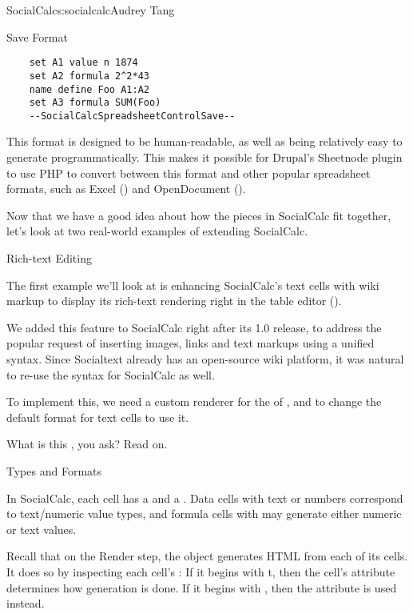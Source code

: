 \begin{aosachapter}{SocialCalc}{s:socialcalc}{Audrey Tang}
\begin{aosasect1}{Save Format}
\begin{verbatim}
    set A1 value n 1874
    set A2 formula 2^2*43
    name define Foo A1:A2
    set A3 formula SUM(Foo)
    --SocialCalcSpreadsheetControlSave--
\end{verbatim}

\noindent This format is designed to be human-readable, as well as being
relatively easy to generate programmatically.  This makes it possible
for Drupal's Sheetnode plugin to use PHP to convert
between this format and other popular spreadsheet formats, such as
Excel () and OpenDocument ().

Now that we have a good idea about how the pieces in SocialCalc fit
together, let's look at two real-world examples of extending
SocialCalc.

\end{aosasect1}

\begin{aosasect1}{Rich-text Editing}

The first example we'll look at is enhancing SocialCalc's text cells
with wiki markup to display its rich-text rendering right in the
table editor ().


We added this feature to SocialCalc right after its 1.0 release, to
address the popular request of inserting images, links and text
markups using a unified syntax.  Since Socialtext already has an
open-source wiki platform, it was natural to re-use the syntax for
SocialCalc as well.

To implement this, we need a custom renderer for the
 of , and to change the default
format for text cells to use it.

What is this , you ask?  Read on.

\begin{aosasect2}{Types and Formats}

In SocialCalc, each cell has a  and a .
Data cells with text or numbers correspond to text/numeric value
types, and formula cells with  may generate either
numeric or text values.

Recall that on the Render step, the  object generates HTML
from each of its cells.  It does so by inspecting each cell's
: If it begins with t, then the cell's
 attribute determines how generation is done.
If it begins with , then the  attribute is
used instead.


\end{aosasect2}
\end{aosasect1}
\end{aosachapter}
